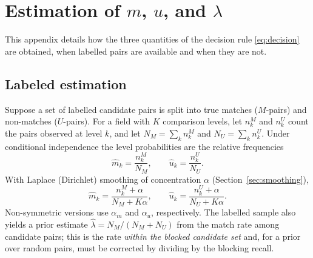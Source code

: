 \documentclass[11pt]{article}
\begin{document}
\section{Estimation of $m$, $u$, and $\lambda$}
\label{app:estimation}
This appendix details how the three quantities of the decision rule
\eqref{eq:decision} are obtained, when labelled pairs are available and when they are not.

\subsection{Labeled estimation}
Suppose a set of labelled candidate pairs is split into true matches ($M$-pairs) and
non-matches ($U$-pairs). For a field with $K$ comparison levels, let $n_{k}^{M}$ and
$n_{k}^{U}$ count the pairs observed at level $k$, and let $N_M=\sum_k n_k^M$ and
$N_U=\sum_k n_k^U$. Under conditional independence the level probabilities are the
relative frequencies
\begin{equation}
\hat m_k=\frac{n_k^{M}}{N_M},\qquad \hat u_k=\frac{n_k^{U}}{N_U}.
\end{equation}
With Laplace (Dirichlet) smoothing of concentration $\alpha$ (Section~\ref{sec:smoothing}),
\begin{equation}
\hat m_k=\frac{n_k^{M}+\alpha}{N_M+K\alpha},\qquad
\hat u_k=\frac{n_k^{U}+\alpha}{N_U+K\alpha}.
\end{equation}
Non-symmetric versions use $\alpha_m$ and $\alpha_u$, respectively. The labelled sample also
yields a prior estimate $\hat\lambda=N_M/(N_M+N_U)$ from the match rate among candidate
pairs; this is the rate \emph{within the blocked candidate set} and, for a prior over
random pairs, must be corrected by dividing by the blocking recall.
\end{document}
